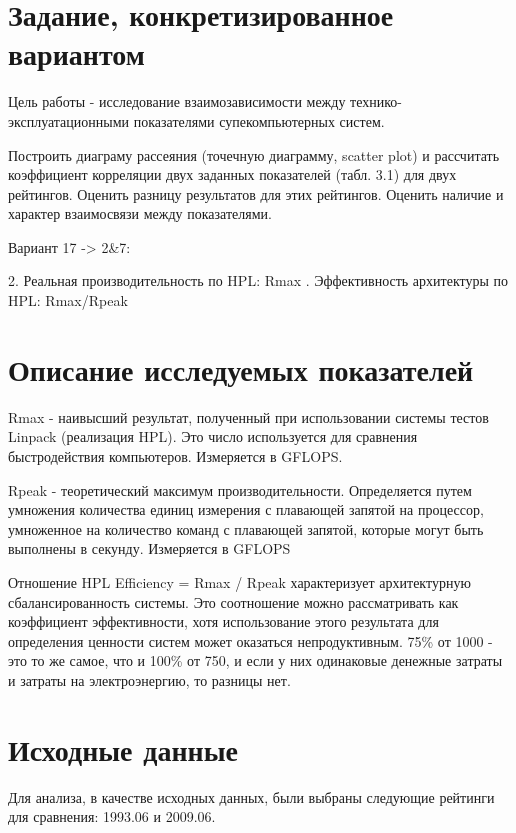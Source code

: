 \documentclass[14pt,a4paper]{extarticle}
\begin{document}
\section{Задание, конкретизированное вариантом}
\begin{sloppypar}
Цель работы - исследование взаимозависимости между технико-эксплуатационными
    показателями супекомпьютерных систем.

    Построить диаграму рассеяния (точечную диаграмму, scatter plot) и
    рассчитать коэффициент корреляции двух заданных показателей (табл. 3.1) для
    двух рейтингов. Оценить разницу результатов для этих рейтингов. Оценить
    наличие и характер взаимосвязи между показателями.
\end{sloppypar}

Вариант 17 -> 2\&7:

2. Реальная производительность по HPL: Rmax
. Эффективность архитектуры по HPL: Rmax/Rpeak


\newpage
\section{Описание исследуемых показателей}
Rmax - наивысший результат, полученный при использовании системы тестов Linpack
(реализация HPL). Это число используется для сравнения быстродействия
компьютеров. Измеряется в GFLOPS.

Rpeak - теоретический максимум производительности. Определяется путем умножения
количества единиц измерения с плавающей запятой на процессор, умноженное на
количество команд с плавающей запятой, которые могут быть выполнены в секунду.
Измеряется в GFLOPS

Отношение HPL Efficiency = Rmax / Rpeak характеризует архитектурную
сбалансированность системы. Это соотношение можно рассматривать как коэффициент
эффективности, хотя использование этого результата для определения ценности
систем может оказаться непродуктивным. 75\% от 1000 - это то же самое, что и
100\% от 750, и если у них одинаковые денежные затраты и затраты на
электроэнергию, то разницы нет.

\sloppy

\section{Исходные данные}

Для анализа, в качестве исходных данных, были выбраны следующие рейтинги для
сравнения: 1993.06 и 2009.06.
\end{document}
